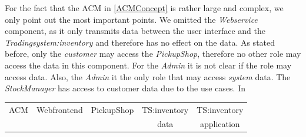 For the fact that the ACM in \autoref{ACMConcept} is rather large and complex, we only point out the most important points. We omitted the \textit{Webservice} component, as it only transmits data between the user interface and the \textit{Tradingsystem:inventory} and therefore has no effect on the data. As stated before, only the \textit{customer} may access the \textit{PickupShop}, therefore no other role may access the data in this component. For the \textit{Admin} it is not clear if the role may access data. Also, the \textit{Admin} it the only role that may access \textit{system} data. The \textit{StockManager} has access to customer data due to the use cases. In 
\begin{landscape}
\begin{table}
\begin{tabular}{|c|c|c|c|c|}
\hline 
ACM & Webfrontend & PickupShop & TS:inventory & TS:inventory \\ 
& & & data & application \\
\hline 


\end{tabular}
\end{table}
\end{landscape}
